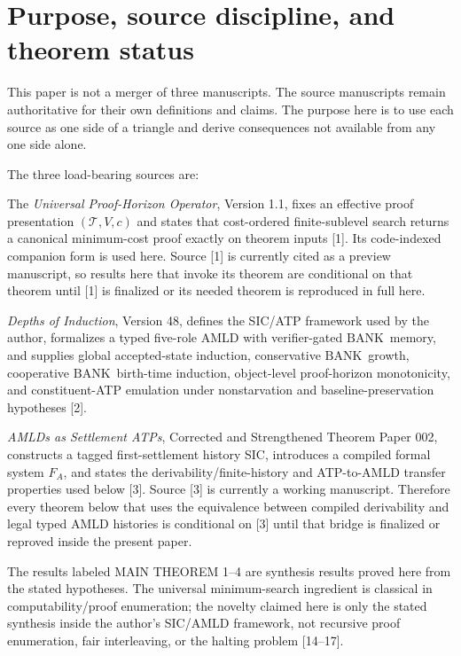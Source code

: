 \documentclass[11pt]{article}
\theoremstyle{definition}
\newcommand{\BANK}{\ensuremath{\mathrm{BANK}}}
\begin{document}
\section{Purpose, source discipline, and theorem status}
This paper is not a merger of three manuscripts. The source manuscripts remain authoritative for their own definitions and claims. The purpose here is to use each source as one side of a triangle and derive consequences not available from any one side alone.

The three load-bearing sources are:
\begin{description}[style=nextline]
\item[S1. Universal proof recovery.] The \emph{Universal Proof-Horizon Operator}, Version 1.1, fixes an effective proof presentation $(\mathcal T,V,c)$ and states that cost-ordered finite-sublevel search returns a canonical minimum-cost proof exactly on theorem inputs [1]. Its code-indexed companion form is used here. Source [1] is currently cited as a preview manuscript, so results here that invoke its theorem are conditional on that theorem until [1] is finalized or its needed theorem is reproduced in full here.

\item[S2. Dynamic cooperative horizons.] \emph{Depths of Induction}, Version 48, defines the SIC/ATP framework used by the author, formalizes a typed five-role AMLD with verifier-gated \BANK\ memory, and supplies global accepted-state induction, conservative \BANK\ growth, cooperative \BANK\ birth-time induction, object-level proof-horizon monotonicity, and constituent-ATP emulation under nonstarvation and baseline-preservation hypotheses [2].

\item[S3. Compilation bridge.] \emph{AMLDs as Settlement ATPs}, Corrected and Strengthened Theorem Paper 002, constructs a tagged first-settlement history SIC, introduces a compiled formal system $F_A$, and states the derivability/finite-history and ATP-to-AMLD transfer properties used below [3]. Source [3] is currently a working manuscript. Therefore every theorem below that uses the equivalence between compiled derivability and legal typed AMLD histories is conditional on [3] until that bridge is finalized or reproved inside the present paper.
\end{description}

The results labeled MAIN THEOREM 1--4 are synthesis results proved here from the stated hypotheses. The universal minimum-search ingredient is classical in computability/proof enumeration; the novelty claimed here is only the stated synthesis inside the author's SIC/AMLD framework, not recursive proof enumeration, fair interleaving, or the halting problem [14--17].
\end{document}
